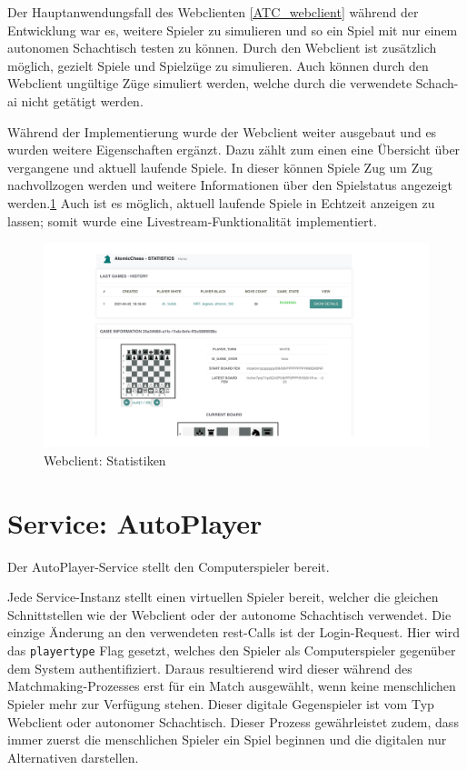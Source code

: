 Der Hauptanwendungsfall des Webclienten \ref{ATC_webclient} während der
Entwicklung war es, weitere Spieler zu simulieren und so ein Spiel mit
nur einem autonomen Schachtisch testen zu können. Durch den Webclient
ist zusätzlich möglich, gezielt Spiele und Spielzüge zu simulieren. Auch
können durch den Webclient ungültige Züge simuliert werden, welche durch
die verwendete Schach-\gls{ai} nicht getätigt werden.

Während der Implementierung wurde der Webclient weiter ausgebaut und es
wurden weitere Eigenschaften ergänzt. Dazu zählt zum einen eine
Übersicht über vergangene und aktuell laufende Spiele. In dieser können
Spiele Zug um Zug nachvollzogen werden und weitere Informationen über
den Spielstatus angezeigt werden.\ref{ATC_statistics} Auch ist es
möglich, aktuell laufende Spiele in Echtzeit anzeigen zu lassen; somit
wurde eine Livestream-Funktionalität implementiert.

\begin{figure}
\centering
\includegraphics{images/ATC_statistics.png}
\caption{Webclient: Statistiken \label{ATC_statistics}}
\end{figure}

\hypertarget{service-autoplayer}{%
\section{Service: AutoPlayer}\label{service-autoplayer}}

Der AutoPlayer-Service stellt den Computerspieler bereit.

Jede Service-Instanz stellt einen virtuellen Spieler bereit, welcher die
gleichen Schnittstellen wie der Webclient oder der autonome Schachtisch
verwendet. Die einzige Änderung an den verwendeten \gls{rest}-Calls ist
der Login-Request. Hier wird das \passthrough{\lstinline!playertype!}
Flag gesetzt, welches den Spieler als Computerspieler gegenüber dem
System authentifiziert. Daraus resultierend wird dieser während des
Matchmaking-Prozesses erst für ein Match ausgewählt, wenn keine
menschlichen Spieler mehr zur Verfügung stehen. Dieser digitale
Gegenspieler ist vom Typ Webclient oder autonomer Schachtisch. Dieser
Prozess gewährleistet zudem, dass immer zuerst die menschlichen Spieler
ein Spiel beginnen und die digitalen nur Alternativen darstellen.

